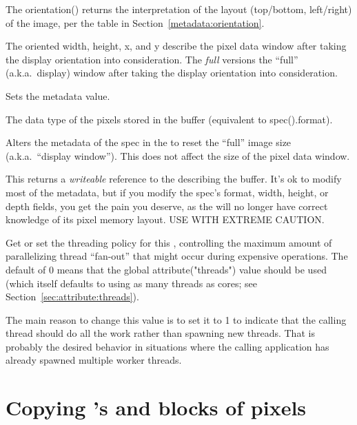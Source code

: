 The {\cf orientation()} returns the interpretation of the layout
(top/bottom, left/right) of the image, per the table in
Section~\ref{metadata:orientation}.

The oriented width, height, x, and y describe the pixel data window
after taking the display orientation into consideration.  The
\emph{full} versions the ``full'' (a.k.a.\ display) window after taking
the display orientation into consideration.
\apiend

Sets the  metadata value.
\apiend

The data type of the pixels stored in the buffer (equivalent to
{\cf spec().format}).
\apiend

Alters the metadata of the spec in the \ImageBuf to reset the ``full''
image size (a.k.a.\ ``display window'').  This does not affect the size
of the pixel data window.
\apiend

This returns a \emph{writeable} reference to the \ImageSpec describing
the buffer.  It's ok to modify most of the metadata, but if you modify
the spec's {\cf format}, {\cf width}, {\cf height}, or {\cf depth}
fields, you get the pain you deserve, as the \ImageBuf will no longer
have correct knowledge of its pixel memory layout.  USE WITH EXTREME
CAUTION.
\apiend

\NEW %
Get or set the threading policy for this \ImageBuf, controlling the
maximum amount of parallelizing thread ``fan-out'' that might occur during
expensive operations. The default of 0 means that the global
{\cf attribute("threads")} value should be used (which itself defaults to
using as many threads as cores; see Section~\ref{sec:attribute:threads}).

The main reason to change this value is to set it to 1 to indicate that the
calling thread should do all the work rather than spawning new threads. That
is probably the desired behavior in situations where the calling application
has already spawned multiple worker threads.
\apiend


\section{Copying \ImageBuf's and blocks of pixels}

